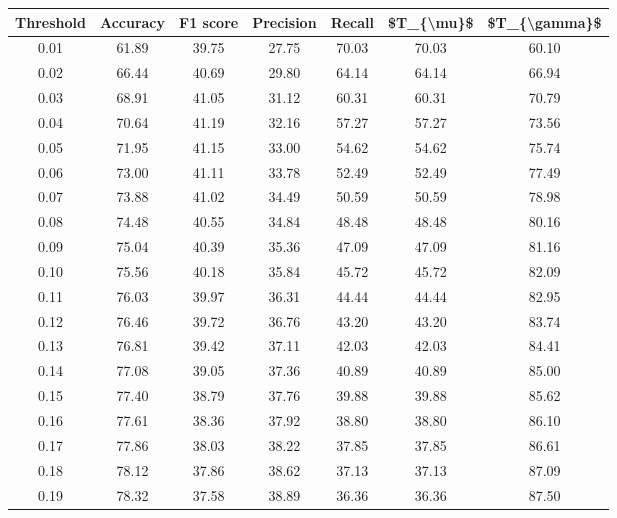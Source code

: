 \begin{tabular}{|c|c|c|c|c|c|c|}
\hline
 Threshold &  Accuracy &  F1 score &  Precision &  Recall &  \$T\_\{\textbackslash mu\}\$ &  \$T\_\{\textbackslash gamma\}\$ \\
\hline
      0.01 &     61.89 &     39.75 &      27.75 &   70.03 &      70.03 &         60.10 \\
      0.02 &     66.44 &     40.69 &      29.80 &   64.14 &      64.14 &         66.94 \\
      0.03 &     68.91 &     41.05 &      31.12 &   60.31 &      60.31 &         70.79 \\
      0.04 &     70.64 &     41.19 &      32.16 &   57.27 &      57.27 &         73.56 \\
      0.05 &     71.95 &     41.15 &      33.00 &   54.62 &      54.62 &         75.74 \\
      0.06 &     73.00 &     41.11 &      33.78 &   52.49 &      52.49 &         77.49 \\
      0.07 &     73.88 &     41.02 &      34.49 &   50.59 &      50.59 &         78.98 \\
      0.08 &     74.48 &     40.55 &      34.84 &   48.48 &      48.48 &         80.16 \\
      0.09 &     75.04 &     40.39 &      35.36 &   47.09 &      47.09 &         81.16 \\
      0.10 &     75.56 &     40.18 &      35.84 &   45.72 &      45.72 &         82.09 \\
      0.11 &     76.03 &     39.97 &      36.31 &   44.44 &      44.44 &         82.95 \\
      0.12 &     76.46 &     39.72 &      36.76 &   43.20 &      43.20 &         83.74 \\
      0.13 &     76.81 &     39.42 &      37.11 &   42.03 &      42.03 &         84.41 \\
      0.14 &     77.08 &     39.05 &      37.36 &   40.89 &      40.89 &         85.00 \\
      0.15 &     77.40 &     38.79 &      37.76 &   39.88 &      39.88 &         85.62 \\
      0.16 &     77.61 &     38.36 &      37.92 &   38.80 &      38.80 &         86.10 \\
      0.17 &     77.86 &     38.03 &      38.22 &   37.85 &      37.85 &         86.61 \\
      0.18 &     78.12 &     37.86 &      38.62 &   37.13 &      37.13 &         87.09 \\
      0.19 &     78.32 &     37.58 &      38.89 &   36.36 &      36.36 &         87.50 \\

\end{tabular}
